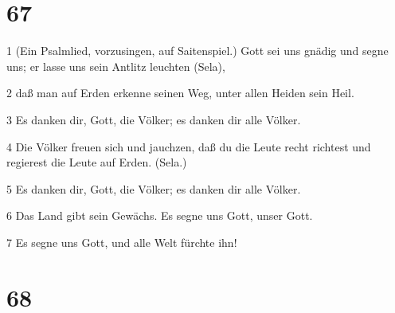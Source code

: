 \chapter{67}

\par 1 (Ein Psalmlied, vorzusingen, auf Saitenspiel.) Gott sei uns gnädig und segne uns; er lasse uns sein Antlitz leuchten (Sela),
\par 2 daß man auf Erden erkenne seinen Weg, unter allen Heiden sein Heil.
\par 3 Es danken dir, Gott, die Völker; es danken dir alle Völker.
\par 4 Die Völker freuen sich und jauchzen, daß du die Leute recht richtest und regierest die Leute auf Erden. (Sela.)
\par 5 Es danken dir, Gott, die Völker; es danken dir alle Völker.
\par 6 Das Land gibt sein Gewächs. Es segne uns Gott, unser Gott.
\par 7 Es segne uns Gott, und alle Welt fürchte ihn!

\chapter{68}

